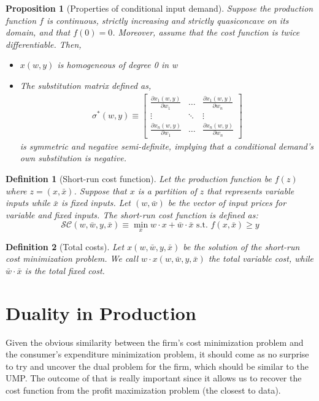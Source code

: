 \documentclass[12pt]{report}
\newtheorem{definition}{Definition}[chapter]
\newtheorem{proposition}{Proposition}[chapter]
\begin{document}
\begin{proposition}[Properties of conditional input demand]
Suppose the production function $f$ is continuous, strictly increasing and strictly quasiconcave on its domain, and that $f(0) = 0$. Moreover, assume that the cost function is twice differentiable. Then,\begin{itemize}
\item $x(w,y)$ is homogeneous of degree 0 in w
\item The substitution matrix defined as,\begin{align*}
\sigma^*(w,y) \equiv \begin{bmatrix}
\frac{\partial x_1(w,y)}{\partial w_1} & \hdots & \frac{\partial x_1(w,y)}{\partial w_n} \\
\vdots & \ddots & \vdots \\
\frac{\partial x_n(w,y)}{\partial w_1} & \hdots & \frac{\partial x_n(w,y)}{\partial w_n}
\end{bmatrix}
\end{align*} is symmetric and negative semi-definite, implying that a conditional demand's own substitution is negative.
\end{itemize}
\end{proposition}

\begin{definition}[Short-run cost function]
Let the production function be $f(z)$ where $z = (x, \bar x)$. Suppose that $x$ is a partition of $z$ that represents variable inputs while $\bar x$ is fixed inputs. Let $(w, \bar w)$ be the vector of input prices for variable and fixed inputs. The short-run cost function is defined as: $$\mathcal{SC}(w,\bar w, y, \bar x)\equiv \min_{x} w\cdot x + \bar w \cdot \bar x \text{ s.t. } f(x,\bar x)\geq y $$
\end{definition}

\begin{definition}[Total costs]
Let $x(w,\bar w, y, \bar x)$ be the solution of the short-run cost minimization problem. We call $w \cdot x(w,\bar w, y, \bar x)$ the total variable cost, while $\bar w \cdot \bar x $ is the total fixed cost.
\end{definition}

\section{Duality in Production}

Given the obvious similarity between the firm's cost minimization problem and the consumer's expenditure minimization problem, it should come as no surprise to try and uncover the dual problem for the firm, which should be similar to the UMP. The outcome of that is really important since it allows us to recover the cost function from the profit maximization problem (the closest to data).
\end{document}
